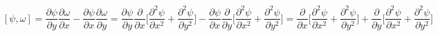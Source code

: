 \documentclass[letterpaper,10pt]{article}
\begin{document}
\[[\psi,\omega]=\frac{\partial \psi}{\partial y}\frac{\partial \omega}{\partial x}-\frac{\partial \psi}{\partial x}\frac{\partial \omega}{\partial y}=\frac{\partial \psi}{\partial y}\frac{\partial}{\partial x}\bigg[\frac{\partial^2 \psi}{\partial x^2}+\frac{\partial^2 \psi}{\partial y^2}\bigg]-\frac{\partial \psi}{\partial x}\frac{\partial}{\partial y}\bigg[\frac{\partial^2 \psi}{\partial x^2}+\frac{\partial^2 \psi}{\partial y^2}\bigg]=\frac{\partial}{\partial x}\bigg[\frac{\partial^2 \psi}{\partial x^2}+\frac{\partial^2 \psi}{\partial y^2}\bigg]+\frac{\partial}{\partial y}\bigg[\frac{\partial^2 \psi}{\partial x^2}+\frac{\partial^2 \psi}{\partial y^2}\bigg]\]
\end{document}
